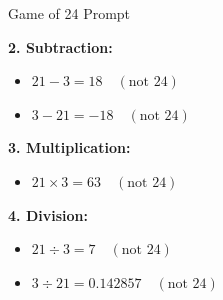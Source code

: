 \documentclass[aspectratio=169, xcolor={dvipsnames}, 10pt, brazil]{beamer}
\begin{document}
\begin{frame}[fragile]{Game of 24 Prompt}
\centering
\begin{tcolorbox}[
    colback=gray!5!white, colframe=black!50!white,
    title=Value Prompt Continue,
    fonttitle=\bfseries, rounded corners, boxrule=1mm,
    width=\textwidth
]

\textbf{2. Subtraction:}
\begin{itemize}
    \item \(21 - 3 = 18 \quad (\text{not } 24)\)
    \item \(3 - 21 = -18 \quad (\text{not } 24)\)
\end{itemize}

\vspace{0.1cm}

\textbf{3. Multiplication:}
\begin{itemize}
    \item \(21 \times 3 = 63 \quad (\text{not } 24)\)
\end{itemize}

\vspace{0.1cm}

\textbf{4. Division:}
\begin{itemize}
    \item \(21 \div 3 = 7 \quad (\text{not } 24)\)
    \item \(3 \div 21 = 0.142857 \quad (\text{not } 24)\)
\end{itemize}

\end{tcolorbox}

\end{frame}
\end{document}
